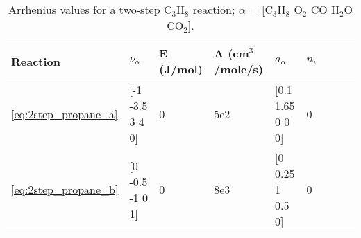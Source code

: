 \documentclass[11pt]{book}
\begin{document}
\begin{table}[ht]
\begin{center}
\caption[Arrhenius values for a two-step C$_3$H$_8$ reaction]{Arrhenius values for a two-step C$_3$H$_8$ reaction; $\alpha$ = [$\mathrm{C_3H_8}$ $\mathrm{O_2}$ $\mathrm{CO}$ $\mathrm{H_2O}$ $\mathrm{CO_2}$].}
\label{two_step_c3h8}
\begin{tabular}{|l|l|l|l|l|l|l|l|l|}
\hline Reaction & $\nu_{\alpha}$ & E (J/mol) & A (cm$^3$/mole/s) & $a_{\alpha}$ & $n_i$  \\ \hline \hline
\ref{eq:2step_propane_a} & [-1 -3.5 3 4 0] & 0 & 5e2 & [0.1 1.65 0 0 0] & 0 \\ \hline
\ref{eq:2step_propane_b} & [0 -0.5 -1 0 1] & 0 & 8e3 & [0 0.25 1 0.5 0] & 0 \\ \hline
\end{tabular}
\end{center}
\end{table}
\end{document}
